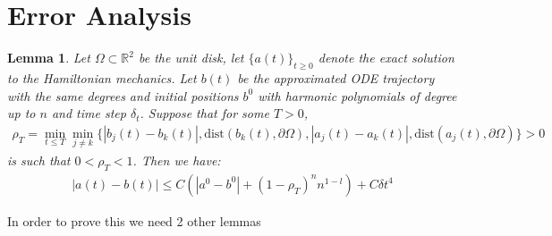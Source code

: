 \documentclass[12pt, a4paper]{article}
\theoremstyle{plain}
\newtheorem{lemma}[theorem]{Lemma}
\theoremstyle{definition}
\newcommand{\R}{\mathbb{R}}
\begin{document}
\section{Error Analysis}

\begin{lemma}
  Let $\Omega \subset \R^2$ be the unit disk, let $\{a(t)\}_{t\geq 0}$ denote the exact solution to the Hamiltonian mechanics.
  Let $b(t)$ be the approximated ODE trajectory with the same degrees and initial positions $b^0$ with harmonic polynomials of degree up to $n$
  and time step $\delta_t$. Suppose that for some $T>0$,
  \begin{align}
  \rho_T = \min_{t\leq T} \min_{j\neq k} \{ |b_j (t) - b_k  (t)|, \text{dist} (b_k(t) , \partial \Omega), |a_j (t) - a_k  (t)|, \text{dist} (a_j(t) , \partial \Omega)\}>0
  \end{align}
  is such that $0 < \rho_T < 1$. Then we have:
  \begin{align}
    |a(t) - b(t)| \leq C (|a^0 -b^0| + (1- \rho_T)^n n^{1-l}) + C \delta t^4
  \end{align}
\end{lemma}

In order to prove this we need 2 other lemmas 
\end{document}
